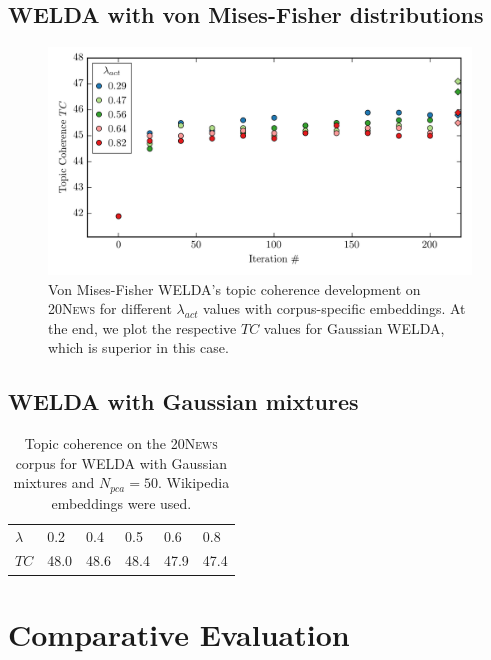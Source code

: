 \documentclass[
        a4paper,
        titlepage,
        twoside,
        parskip,
        numbers=noenddot
        ]{scrbook}
\newcommand{\ra}[1]{\renewcommand{\arraystretch}{#1}}
\theoremstyle{break}
\begin{document}
\begin{appendices}
  \subsection{WELDA with von Mises-Fisher distributions}
  \label{sec:appendix_welda_vmf}
  \begin{figure}[H]
         \centering
         \includegraphics[width=\textwidth]{figures/welda_vmf_20news.png}
         \caption{Von Mises-Fisher WELDA's topic coherence development on \textsc{20News} for different $\lambda_{act}$ values with corpus-specific embeddings. At the end, we plot the respective $TC$ values for Gaussian WELDA, which is superior in this case.}
         \label{fig:welda_vmf_20news}
  \end{figure}

  \subsection{WELDA with Gaussian mixtures}
  \label{sec:appendix_welda_gm}
  \begin{table}[]
    \ra{1.3}
    \centering
    \caption{Topic coherence on the \textsc{20News} corpus for WELDA with Gaussian mixtures and $N_{pca} = 50$. Wikipedia embeddings were used.}
    \label{table:welda_gm}
    \begin{tabular}{llllll}
      \toprule
      $\lambda$ & 0.2  & 0.4  & 0.5  & 0.6  & 0.8  \\
      $TC$     & 48.0 & 48.6 & 48.4 & 47.9 & 47.4 \\
      \bottomrule
    \end{tabular}
  \end{table}


  \section{Comparative Evaluation}

\end{appendices}
\end{document}
